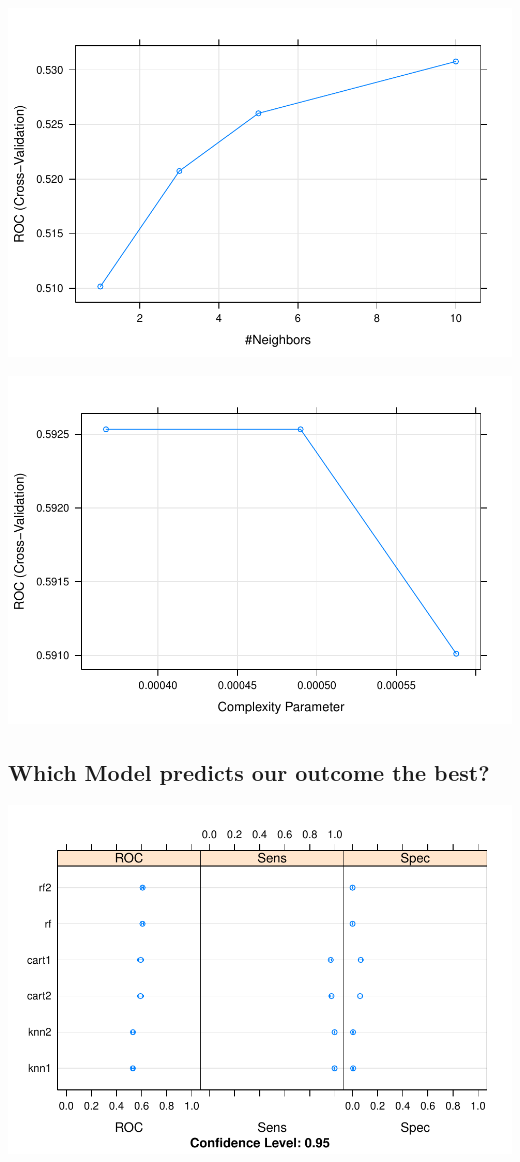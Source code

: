 \documentclass[]{article}
\begin{document}
\includegraphics{Report_Draft_04282019_files/figure-latex/unnamed-chunk-20-1.pdf}

\includegraphics{Report_Draft_04282019_files/figure-latex/unnamed-chunk-22-1.pdf}

\subsection{Which Model predicts our outcome the
best?}\label{which-model-predicts-our-outcome-the-best}

\includegraphics{Report_Draft_04282019_files/figure-latex/unnamed-chunk-27-1.pdf}
\end{document}
